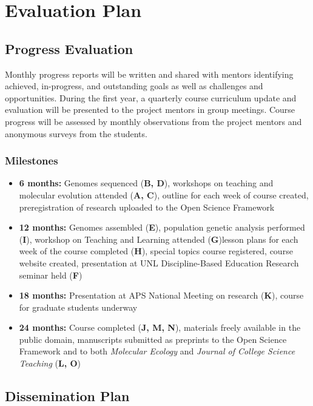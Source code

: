 \documentclass[12pt,letterpaper]{article}
\begin{document}

\section{Evaluation Plan}

\subsection{Progress Evaluation}

Monthly progress reports will be written and shared with mentors identifying achieved, in-progress, and outstanding goals as well as challenges and opportunities. During the first year, a quarterly course curriculum update and evaluation will be presented to the project mentors in group meetings. Course progress will be assessed by monthly observations from the project mentors and anonymous surveys from the students. 

\subsubsection*{Milestones}
\begin{itemize}
  \item \textbf{6 months:} Genomes sequenced (\textbf{B, D}), workshops on teaching and molecular evolution attended (\textbf{A, C}), outline for each week of course created, preregistration of research uploaded to the Open Science Framework
  \item \textbf{12 months:} Genomes assembled (\textbf{E}), population genetic analysis performed (\textbf{I}), workshop on Teaching and Learning attended (\textbf{G})lesson plans for each week of the course completed (\textbf{H}), special topics course registered, course website created, presentation at UNL Discipline-Based Education Research seminar held (\textbf{F})
  \item \textbf{18 months:} Presentation at APS National Meeting on research (\textbf{K}), course for graduate students underway
  \item \textbf{24 months:} Course completed (\textbf{J, M, N}), materials freely available in the public domain, manuscripts submitted as preprints to the Open Science Framework and to both \textit{Molecular Ecology} and \textit{Journal of College Science Teaching} (\textbf{L, O})
\end{itemize}

\subsection{Dissemination Plan}
\end{document}
